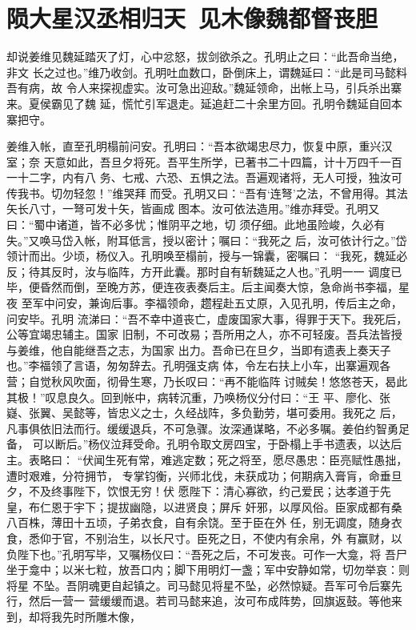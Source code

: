 \chapter{陨大星汉丞相归天~见木像魏都督丧胆}

却说姜维见魏延踏灭了灯，心中忿怒，拔剑欲杀之。孔明止之曰：“此吾命当绝，非文
长之过也。”维乃收剑。孔明吐血数口，卧倒床上，谓魏延曰：“此是司马懿料吾有病，故
令人来探视虚实。汝可急出迎敌。”魏延领命，出帐上马，引兵杀出寨来。夏侯霸见了魏
延，慌忙引军退走。延追赶二十余里方回。孔明令魏延自回本寨把守。

姜维入帐，直至孔明榻前问安。孔明曰：“吾本欲竭忠尽力，恢复中原，重兴汉室；奈
天意如此，吾旦夕将死。吾平生所学，已著书二十四篇，计十万四千一百一十二字，内有八
务、七戒、六恐、五惧之法。吾遍观诸将，无人可授，独汝可传我书。切勿轻忽！”维哭拜
而受。孔明又曰：“吾有‘连弩’之法，不曾用得。其法矢长八寸，一弩可发十矢，皆画成
图本。汝可依法造用。”维亦拜受。孔明又曰：“蜀中诸道，皆不必多忧；惟阴平之地，切
须仔细。此地虽险峻，久必有失。”又唤马岱入帐，附耳低言，授以密计；嘱曰：“我死之
后，汝可依计行之。”岱领计而出。少顷，杨仪入。孔明唤至榻前，授与一锦囊，密嘱曰：
“我死，魏延必反；待其反时，汝与临阵，方开此囊。那时自有斩魏延之人也。”孔明一一
调度已毕，便昏然而倒，至晚方苏，便连夜表奏后主。后主闻奏大惊，急命尚书李福，星夜
至军中问安，兼询后事。李福领命，趱程赴五丈原，入见孔明，传后主之命，问安毕。孔明
流涕曰：“吾不幸中道丧亡，虚废国家大事，得罪于天下。我死后，公等宜竭忠辅主。国家
旧制，不可改易；吾所用之人，亦不可轻废。吾兵法皆授与姜维，他自能继吾之志，为国家
出力。吾命已在旦夕，当即有遗表上奏天子也。”李福领了言语，匆匆辞去。孔明强支病
体，令左右扶上小车，出寨遍观各营；自觉秋风吹面，彻骨生寒，乃长叹曰：“再不能临阵
讨贼矣！悠悠苍天，曷此其极！”叹息良久。回到帐中，病转沉重，乃唤杨仪分付曰：“王
平、廖化、张嶷、张翼、吴懿等，皆忠义之士，久经战阵，多负勤劳，堪可委用。我死之
后，凡事俱依旧法而行。缓缓退兵，不可急骤。汝深通谋略，不必多嘱。姜伯约智勇足备，
可以断后。”杨仪泣拜受命。孔明令取文房四宝，于卧榻上手书遗表，以达后主。表略曰：
“伏闻生死有常，难逃定数；死之将至，愿尽愚忠：臣亮赋性愚拙，遭时艰难，分符拥节，
专掌钧衡，兴师北伐，未获成功；何期病入膏肓，命垂旦夕，不及终事陛下，饮恨无穷！伏
愿陛下：清心寡欲，约己爱民；达孝道于先皇，布仁恩于宇下；提拔幽隐，以进贤良；屏斥
奸邪，以厚风俗。臣家成都有桑八百株，薄田十五顷，子弟衣食，自有余饶。至于臣在外
任，别无调度，随身衣食，悉仰于官，不别治生，以长尺寸。臣死之日，不使内有余帛，外
有赢财，以负陛下也。”孔明写毕，又嘱杨仪曰：“吾死之后，不可发丧。可作一大龛，将
吾尸坐于龛中；以米七粒，放吾口内；脚下用明灯一盏；军中安静如常，切勿举哀：则将星
不坠。吾阴魂更自起镇之。司马懿见将星不坠，必然惊疑。吾军可令后寨先行，然后一营一
营缓缓而退。若司马懿来追，汝可布成阵势，回旗返鼓。等他来到，却将我先时所雕木像，

